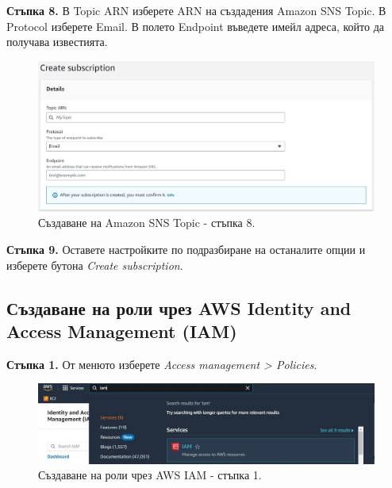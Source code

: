 \documentclass[12pt]{article}
\begin{document}
\noindent\textbf{Стъпка 8.} В Topic ARN изберете ARN на създадения Amazon SNS Topic. В Protocol изберете Email. В полето Endpoint въведете имейл адреса, който да получава известията.
\begin{figure}[h!]
\centering
    \includegraphics[scale=0.5]{instructions/sns/8.JPG}
  \caption{Създаване на Amazon SNS Topic - стъпка 8.}
\end{figure}

\noindent\textbf{Стъпка 9.} Оставете настройките по подразбиране на останалите опции и изберете бутона \textit{Create subscription}.

\clearpage
\pagebreak

\subsection{Създаване на роли чрез AWS Identity and Access Management (IAM)}
\noindent\textbf{Стъпка 1.} От менюто изберете \textit{Access management > Policies}.
\begin{figure}[h!]
\centering
    \includegraphics[scale=0.4]{instructions/iam/1.JPG}
  \caption{Създаване на роли чрез AWS IAM - стъпка 1.}
\end{figure}
\end{document}
